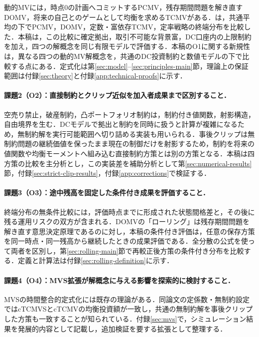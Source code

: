 \documentclass[10pt,a4paper]{article}
\theoremstyle{plain}
\theoremstyle{definition}
\begin{document}
動的MVには，時点0の計画へコミットするPCMV\citep{LiNg2000,ZhouLi2000}，残存期間問題を解き直すDOMV\citep{PedersenPeskir2017,MenoncinVigna2020}，将来の自己とのゲームとして均衡を求めるTCMV\citep{BasakChabakauri2010,BjorkMurgoci2014,BjorkKhapkoMurgoci2017}がある．\citet{vanStadenDangForsyth2021}は，共通平均の下でPCMV，DOMV，定数・富依存TCMV，定率戦略の終端分布を比較した．本稿は，この比較に確定拠出，取引不可能な背景富，DC口座内の上限制約を加え，四つの解概念を同じ有限モデルで評価する．本稿のO1に関する新規性は，異なる四つの動的MV解概念を，共通のDC投資制約と数値モデルの下で比較する点にある．定式化は第\ref{sec:model}--\ref{sec:principles-main}節，理論上の保証範囲は付録\ref{sec:theory}と付録\ref{app:technical-proofs}に示す．

\paragraph{課題2（O2）：直接制約とクリップ近似を加入者成果まで区別すること．}
空売り禁止，破産制約，凸ポートフォリオ制約は，制約付き値関数，射影構造，自由境界を生む\citep{LiZhouLim2002,LiXu2016,BensoussanWongYamYung2014,GuanLiZhouZhou2022}．DCモデルで拠出と制約を同時に扱うと計算が複雑になるため，無制約解を実行可能範囲へ切り詰める実装も用いられる\citep{DiGiacintoFedericoGozziVigna2014,FerreiraMoriciVigna2025}．事後クリップは無制約問題の継続価値を保ったまま現在の制御だけを射影するため，制約を将来の値関数や均衡モーメントへ組み込む直接制約方策とは別の方策となる．本稿は四方策の比較を主分析とし，この実装差を補助分析として第\ref{sec:numerical-results}節，付録\ref{sec:strict-clip-results}，付録\ref{app:corrections}で検証する．

\paragraph{課題3（O3）：途中残高を固定した条件付き成果を評価すること．}
終端分布の無条件比較には，評価時点までに形成された状態間格差と，その後に残る運用リスクの双方が含まれる．DOMVの「ローリング」は残存期間問題を解き直す意思決定原理であるのに対し，本稿の条件付き評価は，任意の保存方策を同一時点・同一残高から継続したときの成果評価である．全分散の公式を使って両者を区別し，第\ref{sec:rolling-main}節で再較正後方策の条件付き分布を比較する．定義と計算法は付録\ref{sec:rolling-definition}に示す．

\paragraph{課題4（O4）：MVS拡張が解概念に与える影響を探索的に検討すること．}
MVSの時間整合的定式化には既存の理論がある\citep{MuTianYang2019}．同論文の定係数・無制約設定ではcTCMVSとcTCMVの均衡投資額が一致し，共通の無制約解を事後クリップした方策も一致することが知られている．付録\ref{sec:mvs}で，シミュレーション結果を発展的内容として記載し，追加検証を要する拡張として整理する．
\end{document}
